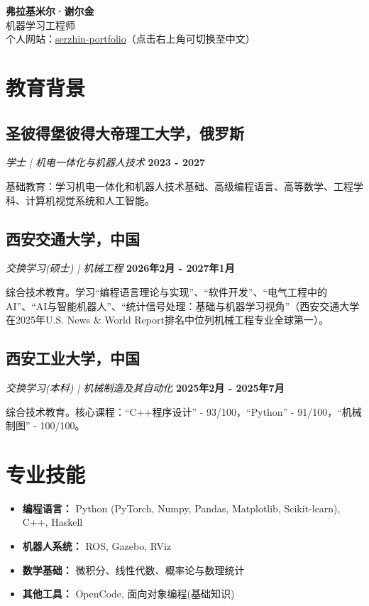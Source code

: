 \documentclass[12pt,a4paper]{article}
\begin{document}
\begin{center}
{\bfseries\Huge\heiti 弗拉基米尔·谢尔金} \\[0.5cm]
机器学习工程师 \\[0.3cm]
个人网站：\href{https://serezhinvm.github.io/serzhin-portfolio/}{\underline{serzhin-portfolio}}（点击右上角可切换至中文）\\
\end{center}

\section{教育背景}

\subsection{圣彼得堡彼得大帝理工大学，俄罗斯}
\textit{学士 | 机电一体化与机器人技术} \hfill \textbf{2023 - 2027}

基础教育：学习机电一体化和机器人技术基础、高级编程语言、高等数学、工程学科、计算机视觉系统和人工智能。

\subsection{西安交通大学，中国}
\textit{交换学习(硕士) | 机械工程} \hfill \textbf{2026年2月 - 2027年1月}

综合技术教育。学习``编程语言理论与实现''、``软件开发''、``电气工程中的AI''、``AI与智能机器人''、``统计信号处理：基础与机器学习视角''（西安交通大学在2025年U.S. News \& World Report排名中位列机械工程专业全球第一）。

\subsection{西安工业大学，中国}
\textit{交换学习(本科) | 机械制造及其自动化} \hspace{1em} \textbf{2025年2月 - 2025年7月}

综合技术教育。核心课程：``C++程序设计'' - 93/100，``Python'' - 91/100，``机械制图'' - 100/100。

\section{专业技能}

\begin{itemize}[noitemsep]
    \item \textbf{编程语言：} Python (PyTorch, Numpy, Pandas, Matplotlib, Scikit-learn), C++, Haskell
    \item \textbf{机器人系统：} ROS, Gazebo, RViz
    \item \textbf{数学基础：} 微积分、线性代数、概率论与数理统计
    \item \textbf{其他工具：} OpenCode, 面向对象编程(基础知识)
\end{itemize}
\end{document}
